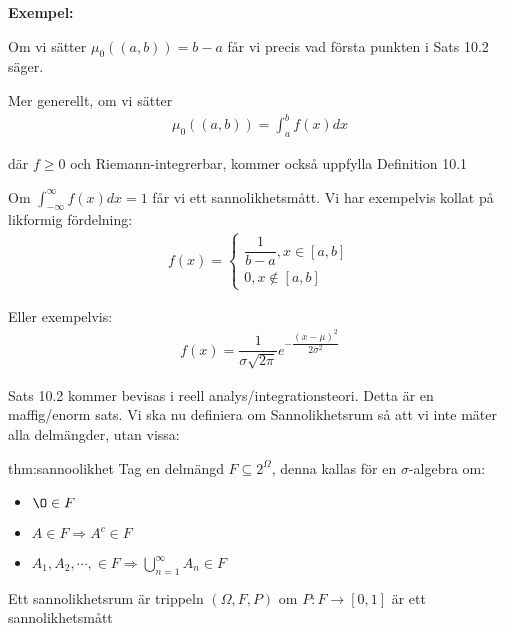 \par\bigskip
\noindent\textbf{Exempel:}\par
\noindent Om vi sätter $\mu_0((a,b)) = b-a$ får vi precis vad första punkten i Sats 10.2 säger.\par
\noindent Mer generellt, om vi sätter
\begin{equation*}
  \begin{gathered}
    \mu_0((a,b)) = \int_{a}^{b}f(x)dx
  \end{gathered}
\end{equation*}\par
\noindent där $f\geq0$ och Riemann-integrerbar, kommer också uppfylla Definition 10.1
\par\bigskip
\noindent Om $\int_{-\infty}^{\infty}f(x)dx = 1$ får vi ett sannolikhetsmått. Vi har exempelvis kollat på likformig fördelning:
\begin{equation*}
  \begin{gathered}
    f(x) = 
    \begin{cases}
      \dfrac{1}{b-a}, x\in[a,b]\\
      0,x\notin[a,b]
    \end{cases}
  \end{gathered}
\end{equation*}\par
\noindent Eller exempelvis:
\begin{equation*}
  \begin{gathered}
    f(x)=\dfrac{1}{\sigma\sqrt{2\pi}}e^{-\dfrac{(x-\mu)^2}{2\sigma^2}}
  \end{gathered}
\end{equation*}
\par\bigskip
\noindent Sats 10.2 kommer bevisas i reell analys/integrationsteori. Detta är en maffig/enorm sats.
\newpage
\noindent Vi ska nu definiera om Sannolikhetsrum så att vi inte mäter alla delmängder, utan vissa:
\par\bigskip
\begin{theo}[Sannolikhetsrum V2]{thm:sannoolikhet}
  Tag en delmängd $F\subseteq 2^\Omega$, denna kallas för en $\sigma$-algebra om:
  \begin{itemize}
    \item $\O\in F$
    \item  $A\in F\Rightarrow A^c\in F$
    \item $A_1,A_2,\cdots, \in F\Rightarrow \bigcup_{n=1}^{\infty}A_n\in F$
  \end{itemize}
  \par\bigskip
  \noindent Ett sannolikhetsrum är trippeln $(\Omega, F, P)$ om $P:F\to[0,1]$ är ett sannolikhetsmått
\end{theo}
